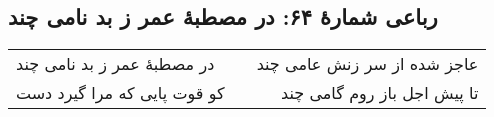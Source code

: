 \begin{center}
\section*{رباعی شمارهٔ ۶۴: در مصطبۀ عمر ز بد نامی چند}
\label{sec:064}
\begin{longtable}{l p{0.5cm} r}
در مصطبهٔ عمر ز بد نامی چند
&&
عاجز شده از سر زنش عامی چند
\\
کو قوت پایی که مرا گیرد دست
&&
تا پیش اجل باز روم گامی چند
\\
\end{longtable}
\end{center}
